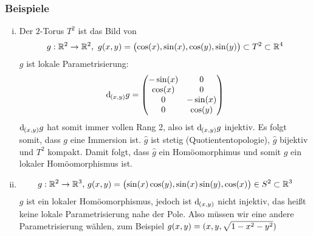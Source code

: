 \subsubsection[Beispiele zur lokalen Parametrisierung]{Beispiele}
\label{ssub:1110}
\begin{enumerate}[(i)]
	\item Der $2$-Torus $T^2$ ist das Bild von
	\[
		g:\mathds{R}^2 \to \mathds{R}^2,\ g(x,y) = \enbrace[\big]{\cos(x),\sin(x),\cos(y),\sin(y)}\subset T^2 \subset \mathds{R}^4
	\]
	$g$ ist lokale Parametrisierung:
	\[
		\mathd_{(x,y)} g = 
		\begin{pmatrix}
		-\sin(x) & 0\\
		\cos(x) & 0\\
		0 & -\sin(x)\\
		0 & \cos(y)
		\end{pmatrix}
	\]
	$\mathd_{(x,y)} g$ hat somit immer vollen Rang 2, also ist $\mathd_{(x,y)} g$ injektiv. Es folgt somit, dass $g$ eine Immersion ist.
	$\hat{g}$ ist stetig (Quotiententopologie), $\hat{g}$ bijektiv und $T^2$ kompakt. Damit folgt, dass $\hat{g}$ ein Homöomorphimus und somit $g$ ein lokaler Homöomorphismus ist.
	\item 
	\[
		g:\mathds{R}^2 \to \mathds{R}^3\text{, } g(x,y) = \enbrace[\big]{\sin(x)\cos(y),\sin(x)\sin(y),\cos(x)} \in S^2\subset \mathds{R}^3
	\]
	$g$ ist ein lokaler Homöomorphismus, jedoch ist $\mathd_{(x,y)}$ nicht injektiv, das heißt keine lokale Parametrisierung nahe der Pole. Also müssen wir eine andere Parametrisierung wählen, zum Beispiel $g(x,y) = \enbrace{x,y,\sqrt{1-x^2-y^2}}$
\end{enumerate}

